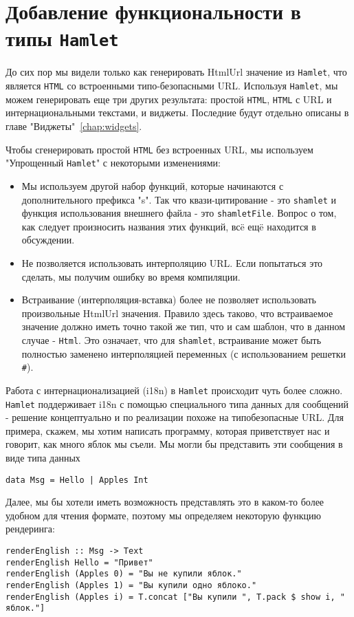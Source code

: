 \section{Добавление функциональности в типы \texttt{Hamlet}}
До сих пор мы видели только как генерировать HtmlUrl значение из \texttt{Hamlet}, что 
является \texttt{HTML} со встроенными типо-безопасными URL. Используя \texttt{Hamlet}, 
мы можем генерировать еще три других результата: простой \texttt{HTML}, \texttt{HTML} с URL и 
интернациональными текстами, и виджеты.
Последние будут отдельно описаны в главе "Виджеты"~\ref{chap:widgets}.

Чтобы сгенерировать простой \texttt{HTML} без встроенных URL, мы используем 
"Упрощенный \texttt{Hamlet}" с некоторыми изменениями:

\begin{itemize}
\item Мы используем другой набор функций, которые начинаются с дополнительного 
префикса "s". Так что квази-цитирование - это \texttt{shamlet} и функция 
использования внешнего файла - это \texttt{shamletFile}. Вопрос о том, как следует произносить
названия этих функций, всë ещë находится в обсуждении.
\item Не позволяется использовать интерполяцию URL. Если попытаться это сделать, 
мы получим ошибку во время компиляции.
\item Встраивание (интерполяция-вставка) более не позволяет использовать произвольные
HtmlUrl значения. Правило здесь таково, что встраиваемое значение должно иметь
точно такой же тип, что и сам шаблон, что в данном случае - \lstinline!Html!. Это означает,
что для \texttt{shamlet}, встраивание может быть полностью заменено интерполяцией
переменных (с использованием решетки \texttt{\#}).
\end{itemize}

Работа с интернационализацией (i18n) в \texttt{Hamlet} происходит чуть более сложно.
\texttt{Hamlet} поддерживает i18n с помощью специального типа данных для сообщений - решение
концептуально и по реализации похоже на типобезопасные URL. Для примера, скажем, 
мы хотим написать программу, которая приветствует нас и говорит, как много яблок 
мы съели. Мы могли бы представить эти сообщения в виде типа данных

\begin{lstlisting}
data Msg = Hello | Apples Int
\end{lstlisting}

Далее, мы бы хотели иметь возможность представлять это в каком-то более удобном
для чтения формате, поэтому мы определяем некоторую функцию рендеринга:
\begin{lstlisting}
renderEnglish :: Msg -> Text
renderEnglish Hello = "Привет"
renderEnglish (Apples 0) = "Вы не купили яблок."
renderEnglish (Apples 1) = "Вы купили одно яблоко."
renderEnglish (Apples i) = T.concat ["Вы купили ", T.pack $ show i, " яблок."]
\end{lstlisting}

